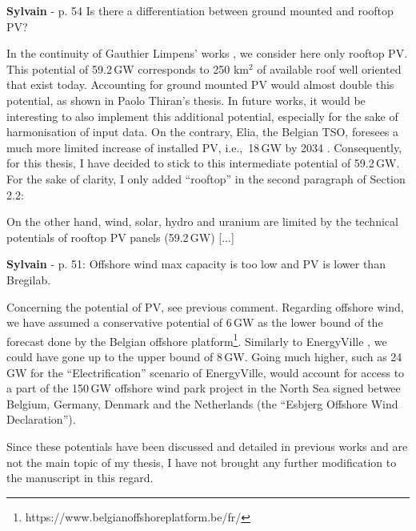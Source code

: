 \documentclass[12pt,a4paper]{article}
\def\ie{i.e.,\ }
\begin{document}
\begin{mdframed}[style=comment] %
{\color{purple} \textbf{Sylvain}} - p. 54 Is there a differentiation between ground mounted and rooftop PV?
\end{mdframed}

\noindent In the continuity of Gauthier Limpens' works \cite{limpens2021generating}, we consider here only rooftop PV. This potential of 59.2\,GW corresponds to 250 km$^2$ of available roof well oriented that exist today. Accounting for ground mounted PV would almost double this potential, as shown in Paolo Thiran's thesis. In future works, it would be interesting to also implement this additional potential, especially for the sake of harmonisation of input data. On the contrary, Elia, the Belgian TSO, foresees a much more limited increase of installed PV, \ie 18\,GW by 2034 \cite{Elia_2024_2034}. Consequently, for this thesis, I have decided to stick to this intermediate potential of 59.2\,GW. For the sake of clarity, I only added ``rooftop'' {\color{blue}in the second paragraph of Section 2.2}:

\begin{mdframed}[style=manuscript] %
On the other hand, wind, solar, hydro and uranium are limited by the technical potentials of rooftop PV panels (59.2\,GW) [...]
\end{mdframed}

\begin{mdframed}[style=comment] %
{\color{purple} \textbf{Sylvain}} - p. 51: Offshore wind max capacity is too low and PV is lower than Bregilab.
\end{mdframed}

\noindent Concerning the potential of PV, see previous comment. Regarding offshore wind, we have assumed a conservative potential of 6\,GW as the lower bound of the forecast done by the Belgian offshore platform\footnote{https://www.belgianoffshoreplatform.be/fr/}. Similarly to EnergyVille \cite{PATHS2050}, we could have gone up to the upper bound of 8\,GW. Going much higher, such as 24\,GW for the ``Electrification'' scenario of EnergyVille, would account for access to a part of the 150\,GW offshore wind park project in the North Sea signed betwee Belgium, Germany, Denmark and the Netherlands (the ``Esbjerg Offshore Wind Declaration''). 

\noindent Since these potentials have been discussed and detailed in previous works and are not the main topic of my thesis, I have not brought any further modification to the manuscript in this regard.
\end{document}
